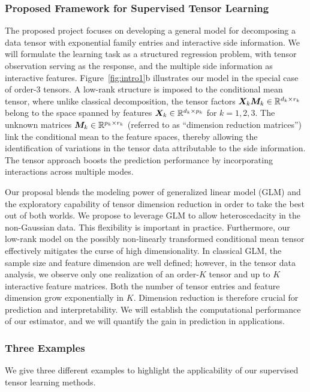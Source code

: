\documentclass[10pt]{article}
\theoremstyle{definition}
\theoremstyle{definition}
\theoremstyle{definition}
\begin{document}
\subsubsection{Proposed Framework for Supervised Tensor Learning} 
The proposed project focuses on developing a general model for decomposing a data tensor with exponential family entries and interactive side information. We will formulate the learning task as a structured regression problem, with tensor observation serving as the response, and the multiple side information as interactive features. Figure~\ref{fig:intro1}b illustrates our model in the special case of order-3 tensors. A low-rank structure is imposed to the conditional mean tensor, where unlike classical decomposition, the tensor factors $\bm X_k\bm M_k\in\mathbb{R}^{d_k\times r_k}$ belong to the space spanned by features $\bm X_k\in\mathbb{R}^{d_k\times p_k}$ for $k=1,2,3$. The unknown matrices $\bm M_k\in\mathbb{R}^{p_k\times r_k}$ (referred to as ``dimension reduction matrices'') link the conditional mean to the feature spaces, thereby allowing the identification of variations in the tensor data attributable to the side information. The tensor approach boosts the prediction performance by incorporating interactions across multiple modes. 


Our proposal blends the modeling power of generalized linear model (GLM) and the exploratory capability of tensor dimension reduction in order to take the best out of both worlds. We propose to leverage GLM to allow heteroscedacity in the non-Gaussian data. This flexibility is important in practice. Furthermore, our low-rank model on the possibly non-linearly transformed conditional mean tensor effectively mitigates the curse of high dimensionality. In classical GLM, the sample size and feature dimension are well defined; however, in the tensor data analysis, we observe only one realization of an order-$K$ tensor and up to $K$ interactive feature matrices. Both the number of tensor entries and feature dimension grow exponentially in $K$. Dimension reduction is therefore crucial for prediction and interpretability. We will establish the computational performance of our estimator, and we will quantify the gain in prediction in applications. 

\subsubsection{Three Examples}
We give three different examples to highlight the applicability of our supervised tensor learning methods.\\
\end{document}
